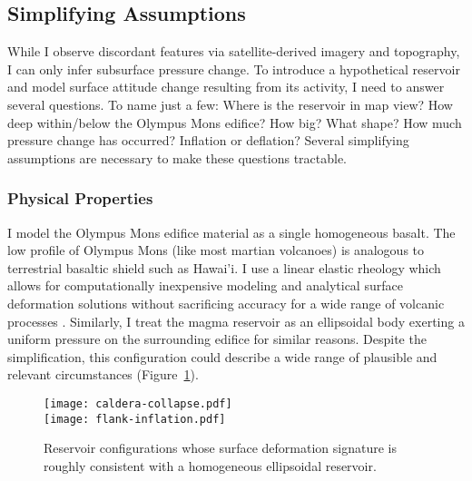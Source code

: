 \subsection{Simplifying Assumptions}

While I observe discordant features via satellite-derived imagery and topography, I can only infer subsurface pressure change. To introduce a hypothetical reservoir and model surface attitude change resulting from its activity, I need to answer several questions. To name just a few: Where is the reservoir in map view? How deep within/below the Olympus Mons edifice? How big? What shape? How much pressure change has occurred? Inflation or deflation? Several simplifying assumptions are necessary to make these questions tractable.

\subsubsection{Physical Properties}

I model the Olympus Mons edifice material as a single homogeneous basalt. The low profile of Olympus Mons (like most martian volcanoes) is analogous to terrestrial basaltic shield such as Hawai'i. %
I use a linear elastic rheology which allows for computationally inexpensive modeling and analytical surface deformation solutions \parencite{mogi_relations_1958} without sacrificing accuracy for a wide range of volcanic processes \parencite{grosfils_elastic_2015}. Similarly, I treat the magma reservoir as an ellipsoidal body exerting a uniform pressure on the surrounding edifice for similar reasons. Despite the simplification, this configuration could describe a wide range of plausible and relevant circumstances (Figure~\ref{fig:reservoir-configs}). %

\begin{figure}
    \texttt{[image: caldera-collapse.pdf]}\\
    \vspace{2cm}
    \texttt{[image: flank-inflation.pdf]}
    \caption{Reservoir configurations whose surface deformation signature is roughly consistent with a homogeneous ellipsoidal reservoir.}
    \label{fig:reservoir-configs}
\end{figure}

